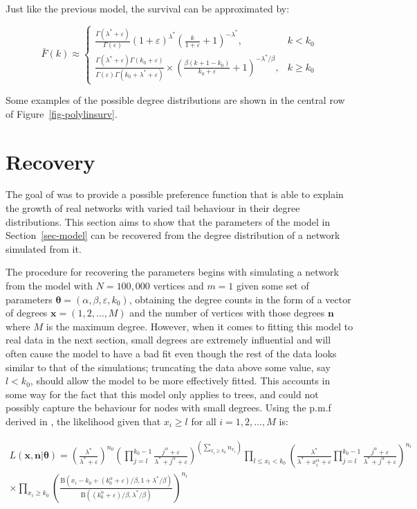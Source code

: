 \documentclass[
  sn-basic,
]{sn-jnl}
\theoremstyle{plain}
\theoremstyle{remark}
\begin{document}
Just like the previous model, the survival can be approximated by:

\[
\bar F(k) \approx \begin{cases}
\frac{\Gamma(\lambda^*+\varepsilon)}{\Gamma(\varepsilon)} (1+\varepsilon)^{\lambda^*}\left(\frac{k}{1+\varepsilon} + 1\right)^{-\lambda^*},&k<k_0\\
\frac{\Gamma(\lambda^*+\varepsilon)\Gamma(k_0+\varepsilon)}{\Gamma(\varepsilon)\Gamma(k_0+\lambda^*+\varepsilon)}\times\left(\frac{\beta(k+1-k_0)}{k_0+\varepsilon} + 1\right)^{-\lambda^*/\beta},&k\ge k_0
\end{cases}
\]

Some examples of the possible degree distributions are shown in the
central row of Figure~\ref{fig-polylinsurv}.

\section{Recovery}\label{sec-rec}

The goal of was to provide a possible preference function that is able
to explain the growth of real networks with varied tail behaviour in
their degree distributions. This section aims to show that the
parameters of the model in Section~\ref{sec-model} can be recovered from
the degree distribution of a network simulated from it.

The procedure for recovering the parameters begins with simulating a
network from the model with \(N=100,000\) vertices and \(m=1\) given
some set of parameters
\(\pmb\theta = (\alpha, \beta, \varepsilon, k_0)\), obtaining the degree
counts in the form of a vector of degrees \(\pmb x = (1,2,\ldots,M)\)
and the number of vertices with those degrees \(\pmb n\) where \(M\) is
the maximum degree. However, when it comes to fitting this model to real
data in the next section, small degrees are extremely influential and
will often cause the model to have a bad fit even though the rest of the
data looks similar to that of the simulations; truncating the data above
some value, say \(l<k_0\), should allow the model to be more effectively
fitted. This accounts in some way for the fact that this model only
applies to trees, and could not possibly capture the behaviour for nodes
with small degrees. Using the p.m.f derived in \citep{rudas07}, the
likelihood given that \(x_i \ge l\) for all \(i =1,2,\ldots,M\) is:

\begin{align*}
L(\pmb x,\pmb n | \pmb \theta) = \left(\frac{\lambda^*}{\lambda^*+\varepsilon}\right)^{n_0}\left(\prod_{j=l}^{k_0-1}\frac{j^\alpha +\varepsilon}{\lambda^* + j^\alpha +\varepsilon}\right)^{\left(\sum_{x_i\ge k_0}n_{x_i}\right)} \prod_{l \le x_i<k_0}\left(\frac{\lambda^*}{\lambda^* +x_i^\alpha + \varepsilon } \prod_{j=l}^{k_0-1}\frac{j^\alpha + \varepsilon}{\lambda^* + j^\alpha + \varepsilon}\right)^{n_i}\\ \times \prod_{x_i\ge k_0}\left(\frac{\text{B}(x_i-k_0 + (k_0^\alpha + \varepsilon)/\beta,1+\lambda^*/\beta)}{\text{B}((k_0^\alpha + \varepsilon)/\beta,\lambda^*/\beta)}\right)^{n_i}
\end{align*}
\end{document}
